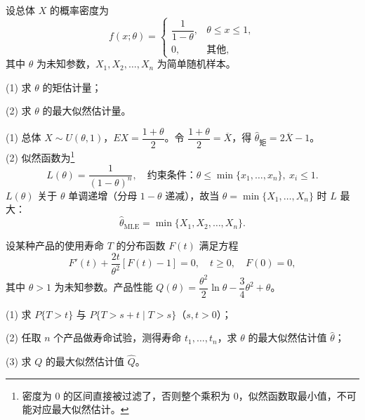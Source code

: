 ﻿\documentclass[lang=cn,11pt]{elegantbook}
\begin{document}
\begin{exercise}\label{exer:7-unif-theta}
设总体 \(X\) 的概率密度为
\[
f(x;\theta) = \begin{cases} \dfrac{1}{1-\theta}, & \theta \leq x \leq 1, \\[4pt] 0, & \text{其他}, \end{cases}
\]
其中 \(\theta\) 为未知参数，\(X_1, X_2, \dots, X_n\) 为简单随机样本。\par
(1) 求 \(\theta\) 的矩估计量；\par
(2) 求 \(\theta\) 的最大似然估计量。
\end{exercise}
\begin{solution}
(1) 总体 \(X \sim U(\theta, 1)\)，\(EX = \dfrac{1+\theta}{2}\)。令 \(\dfrac{1+\theta}{2} = \overline{X}\)，得 \(\hat{\theta}_{\text{矩}} = 2\overline{X}-1\)。\\
(2) 似然函数为\footnote{密度为 0 的区间直接被过滤了，否则整个乘积为 0，似然函数取最小值，不可能对应最大似然估计。}
\[
L(\theta) = \frac{1}{(1-\theta)^n},\quad \text{约束条件：}\theta \leq \min\{x_1, \dots, x_n\},\ x_i \leq 1.
\]
\(L(\theta)\) 关于 \(\theta\) 单调递增（分母 \(1-\theta\) 递减），故当 \(\theta = \min\{X_1, \dots, X_n\}\) 时 \(L\) 最大：
\[
\hat{\theta}_{\text{MLE}} = \min\{X_1, X_2, \dots, X_n\}.
\]
\end{solution}




\begin{exercise}\label{exer:7-rayleigh}
设某种产品的使用寿命 \(T\) 的分布函数 \(F(t)\) 满足方程
\[
F'(t) + \frac{2t}{\theta^2}[F(t)-1] = 0,\quad t \geq 0,\quad F(0) = 0,
\]
其中 \(\theta > 1\) 为未知参数。产品性能 \(Q(\theta) = \dfrac{\theta^2}{2}\ln\theta - \dfrac{3}{4}\theta^2 + \theta\)。\par
(1) 求 \(P\{T > t\}\) 与 \(P\{T > s+t \mid T > s\}\)（\(s,t > 0\)）；\par
(2) 任取 \(n\) 个产品做寿命试验，测得寿命 \(t_1, \dots, t_n\)，求 \(\theta\) 的最大似然估计值 \(\hat{\theta}\)；\par
(3) 求 \(Q\) 的最大似然估计值 \(\hat{Q}\)。
\end{exercise}
\end{document}
